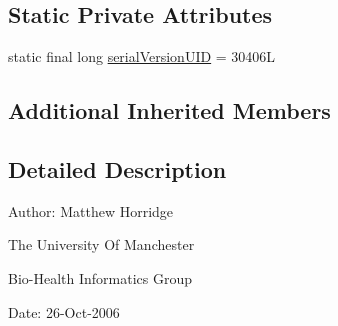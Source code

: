 \subsection*{Static Private Attributes}
\begin{DoxyCompactItemize}
\item 
static final long \hyperlink{classuk_1_1ac_1_1manchester_1_1cs_1_1owl_1_1owlapi_1_1_o_w_l_data_exact_cardinality_impl_a04601ba352d361efee99c81d724eb8d5}{serial\-Version\-U\-I\-D} = 30406\-L
\end{DoxyCompactItemize}
\subsection*{Additional Inherited Members}


\subsection{Detailed Description}
Author\-: Matthew Horridge\par
 The University Of Manchester\par
 Bio-\/\-Health Informatics Group\par
 Date\-: 26-\/\-Oct-\/2006\par
 \par
 

